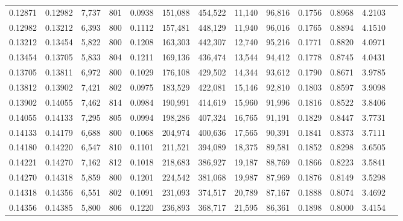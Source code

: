 \begin{tabular}{rrrrrrrrrrrrr}
0.12871 & 0.12982 &  7,737 & 801 &                                     0.0938 & 151,088 & 454,522 &  11,140 &  96,816 & 0.1756 & 0.8968 & 4.2103 \\
0.12982 & 0.13212 &  6,393 & 800 &                                     0.1112 & 157,481 & 448,129 &  11,940 &  96,016 & 0.1765 & 0.8894 & 4.1510 \\
0.13212 & 0.13454 &  5,822 & 800 &                                     0.1208 & 163,303 & 442,307 &  12,740 &  95,216 & 0.1771 & 0.8820 & 4.0971 \\
0.13454 & 0.13705 &  5,833 & 804 &                                     0.1211 & 169,136 & 436,474 &  13,544 &  94,412 & 0.1778 & 0.8745 & 4.0431 \\
0.13705 & 0.13811 &  6,972 & 800 &                                     0.1029 & 176,108 & 429,502 &  14,344 &  93,612 & 0.1790 & 0.8671 & 3.9785 \\
0.13812 & 0.13902 &  7,421 & 802 &                                     0.0975 & 183,529 & 422,081 &  15,146 &  92,810 & 0.1803 & 0.8597 & 3.9098 \\
0.13902 & 0.14055 &  7,462 & 814 &                                     0.0984 & 190,991 & 414,619 &  15,960 &  91,996 & 0.1816 & 0.8522 & 3.8406 \\
0.14055 & 0.14133 &  7,295 & 805 &                                     0.0994 & 198,286 & 407,324 &  16,765 &  91,191 & 0.1829 & 0.8447 & 3.7731 \\
0.14133 & 0.14179 &  6,688 & 800 &                                     0.1068 & 204,974 & 400,636 &  17,565 &  90,391 & 0.1841 & 0.8373 & 3.7111 \\
0.14180 & 0.14220 &  6,547 & 810 &                                     0.1101 & 211,521 & 394,089 &  18,375 &  89,581 & 0.1852 & 0.8298 & 3.6505 \\
0.14221 & 0.14270 &  7,162 & 812 &                                     0.1018 & 218,683 & 386,927 &  19,187 &  88,769 & 0.1866 & 0.8223 & 3.5841 \\
0.14270 & 0.14318 &  5,859 & 800 &                                     0.1201 & 224,542 & 381,068 &  19,987 &  87,969 & 0.1876 & 0.8149 & 3.5298 \\
0.14318 & 0.14356 &  6,551 & 802 &                                     0.1091 & 231,093 & 374,517 &  20,789 &  87,167 & 0.1888 & 0.8074 & 3.4692 \\
0.14356 & 0.14385 &  5,800 & 806 &                                     0.1220 & 236,893 & 368,717 &  21,595 &  86,361 & 0.1898 & 0.8000 & 3.4154 \\

\end{tabular}
